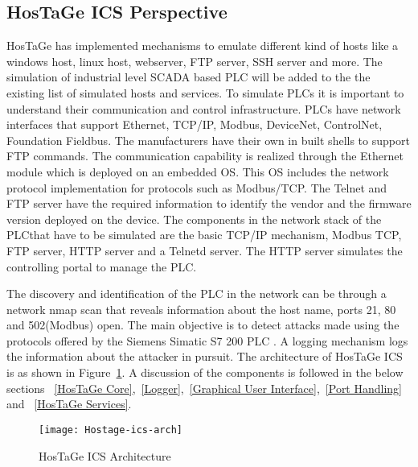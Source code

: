 \documentclass[article,msc=informatik,type=msc,colorback,accentcolor=tud9c]{tudthesis}
\begin{document}
   		
  \vspace{3mm} 
  \subsection{HosTaGe ICS Perspective}\label{HosTaGe ICS Perspective}
  
  HosTaGe has implemented mechanisms to emulate different kind of hosts like a windows host, linux host, webserver, \ac{FTP} server, \ac{SSH} server and more. The simulation of industrial level \ac{SCADA} based \ac{PLC} will be added to the the existing list of simulated hosts and services. To simulate \ac{PLC}s it is important to understand their communication and control infrastructure. \ac{PLC}s have network interfaces that support Ethernet, TCP/IP, Modbus\cite{4627171}, DeviceNet\cite{898793}, ControlNet\cite{898793}, Foundation Fieldbus\cite{1435740}. The manufacturers have their own in built shells to support \ac{FTP} commands.  The communication capability is realized through the Ethernet module which is deployed on an embedded \ac{OS}. This \ac{OS} includes the network protocol implementation for protocols such as Modbus/TCP. The Telnet and FTP server have the required information to identify the vendor and the firmware version deployed on the device. The components in the network stack  of the \ac{PLC}that have to be simulated are the basic TCP/IP mechanism, Modbus TCP, \ac{FTP} server, HTTP server and a Telnetd server. The HTTP server simulates the controlling portal to  manage the \ac{PLC}.
 
   \vspace{3mm}    
  The discovery and identification of the \ac{PLC} in the network can be through a network nmap scan that reveals information about the host name, ports 21, 80 and 502(Modbus) open.      
  The main objective is to detect attacks made using the protocols offered by the Siemens Simatic S7 200 \ac{PLC} . A logging mechanism logs the information about the attacker in pursuit.  
  The architecture of HosTaGe ICS is as shown in Figure~\ref{f:Hostage ICS Architetcure}. A discussion of the components is followed in the below sections ~\ref{HosTaGe Core},~\ref{Logger},~\ref{Graphical User Interface},~\ref{Port Handling} and ~\ref{HosTaGe Services}.
  
  
  \begin{figure}[h]
  \centering
             \texttt{[image: Hostage-ics-arch]}
             \caption[HosTaGe ICS Architecture]{\label{f:Hostage ICS Architetcure}HosTaGe ICS Architecture}
  \end{figure}
       
\end{document}
